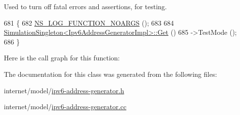 Used to turn off fatal errors and assertions, for testing. 


\begin{DoxyCode}
681 \{
682   \hyperlink{log-macros-disabled_8h_a8f7e4afc291c9d29a65c18ac1f79197b}{NS\_LOG\_FUNCTION\_NOARGS} ();
683 
684   \hyperlink{classns3_1_1SimulationSingleton_a35870bf2664aaa6e653ce99fb68fc8fc}{SimulationSingleton<Ipv6AddressGeneratorImpl>::Get} ()
685   ->TestMode ();
686 \}
\end{DoxyCode}


Here is the call graph for this function\+:




The documentation for this class was generated from the following files\+:\begin{DoxyCompactItemize}
\item 
internet/model/\hyperlink{ipv6-address-generator_8h}{ipv6-\/address-\/generator.\+h}\item 
internet/model/\hyperlink{ipv6-address-generator_8cc}{ipv6-\/address-\/generator.\+cc}\end{DoxyCompactItemize}
